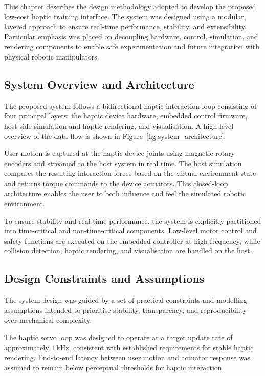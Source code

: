 
This chapter describes the design methodology adopted to develop the proposed low-cost haptic training interface. The system was designed using a modular, layered approach to ensure real-time performance, stability, and extensibility. Particular emphasis was placed on decoupling hardware, control, simulation, and rendering components to enable safe experimentation and future integration with physical robotic manipulators.

\subsection{System Overview and Architecture}

The proposed system follows a bidirectional haptic interaction loop consisting of four principal layers: the haptic device hardware, embedded control firmware, host-side simulation and haptic rendering, and visualisation. A high-level overview of the data flow is shown in Figure~\ref{fig:system_architecture}.

User motion is captured at the haptic device joints using magnetic rotary encoders and streamed to the host system in real time. The host simulation computes the resulting interaction forces based on the virtual environment state and returns torque commands to the device actuators. This closed-loop architecture enables the user to both influence and feel the simulated robotic environment.

To ensure stability and real-time performance, the system is explicitly partitioned into time-critical and non-time-critical components. Low-level motor control and safety functions are executed on the embedded controller at high frequency, while collision detection, haptic rendering, and visualisation are handled on the host.


\subsection{Design Constraints and Assumptions}
The system design was guided by a set of practical constraints and modelling assumptions intended to prioritise stability, transparency, and reproducibility over mechanical complexity.

The haptic servo loop was designed to operate at a target update rate of approximately $1~\text{kHz}$, consistent with established requirements for stable haptic rendering. End-to-end latency between user motion and actuator response was assumed to remain below perceptual thresholds for haptic interaction.

